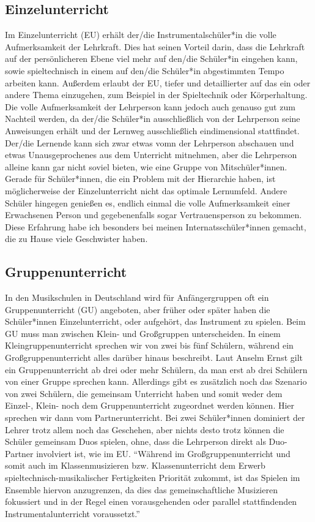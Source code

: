\subsection{Einzelunterricht}
Im Einzelunterricht (EU) erhält der/die Instrumentalschüler*in die volle Aufmerksamkeit
der Lehrkraft. Dies hat seinen Vorteil darin, dass die Lehrkraft auf der
persönlicheren Ebene viel mehr auf den/die Schüler*in eingehen kann, sowie
spieltechnisch in einem auf den/die Schüler*in abgestimmten Tempo arbeiten kann.
Außerdem erlaubt der EU, tiefer und detaillierter auf das ein oder andere Thema
einzugehen, zum Beispiel in der Spieltechnik oder Körperhaltung. Die volle
Aufmerksamkeit der Lehrperson kann jedoch auch genauso gut zum Nachteil werden, da
der/die Schüler*in ausschließlich von der Lehrperson seine Anweisungen erhält und der
Lernweg ausschließlich eindimensional stattfindet. Der/die Lernende kann sich zwar
etwas vomn der Lehrperson abschauen und etwas
Unausgeprochenes aus dem Unterricht mitnehmen, aber die Lehrperson alleine kann gar
nicht soviel bieten, wie eine Gruppe von Mitschüler*innen. Gerade für Schüler*innen, die
ein Problem mit der Hierarchie haben, ist möglicherweise der Einzelunterricht
nicht das optimale Lernumfeld. Andere Schüler hingegen genießen es, endlich
einmal die volle Aufmerksamkeit einer Erwachsenen Person und gegebenenfalls
sogar Vertrauensperson zu bekommen. Diese Erfahrung habe ich besonders bei
meinen Internatsschüler*innen gemacht, die zu Hause
viele Geschwister haben. 

\subsection{Gruppenunterricht} 
In den Musikschulen in Deutschland wird für Anfängergruppen oft ein
Gruppenunterricht (GU) angeboten, aber früher oder später haben die
Schüler*innen Einzelunterricht, oder aufgehört, das Instrument zu spielen.
Beim GU muss man zwischen Klein- und Großgruppen unterscheiden.
In einem Kleingruppenunterricht sprechen wir von zwei bis fünf Schülern, während
ein Großgruppenunterricht alles darüber hinaus beschreibt.
\autocite[219]{busch:grundwissen_instrumentalpaedagogik} Laut Anselm Ernst gilt
ein Gruppenunterricht ab drei oder mehr Schülern, da man erst ab drei Schülern
von einer Gruppe sprechen kann.
\autocite[79]{ernst:die_zukunftsfaehige_musikschule}
Allerdings gibt es zusätzlich noch das Szenario von zwei Schülern, die gemeinsam
Unterricht haben und somit weder dem Einzel-, Klein- noch dem Gruppenunterricht
zugeordnet werden können. Hier sprechen wir dann vom
Partnerunterricht.\autocite[219]{busch:grundwissen_instrumentalpaedagogik} Bei
zwei Schüler*innen dominiert der Lehrer trotz allem noch das Geschehen, aber nichts
desto trotz können die Schüler gemeinsam Duos spielen, ohne, dass die Lehrperson
direkt als Duo-Partner involviert ist, wie im EU. \enquote{Während im
Großgruppenunterricht und somit auch im Klassenmusizieren bzw. Klassenunterricht
dem Erwerb spieltechnisch-musikalischer Fertigkeiten Priorität zukommt, ist das
Spielen im Ensemble hiervon anzugrenzen, da dies das gemeinschaftliche
Musizieren fokussiert und in der Regel einen vorausgehenden oder parallel
stattfindenden Instrumentalunterricht
voraussetzt.}\autocite[219]{busch:grundwissen_instrumentalpaedagogik}

